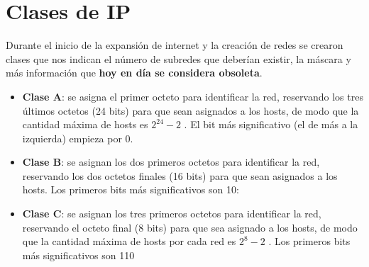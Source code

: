 \section{Clases de IP}
Durante el inicio de la expansión de internet y la creación de redes se crearon clases que nos indican el número de subredes que deberían existir, la máscara y más información que \textbf{hoy en día se considera obsoleta}.

\begin{itemize}
    \item \textbf{Clase A}: se asigna el primer octeto para identificar la red, reservando los tres últimos octetos (24 bits) para que sean asignados a los hosts, de modo que la cantidad máxima de hosts es $2^{24} - 2$ . El bit más significativo (el de más a la izquierda) empieza por 0.

    \item \textbf{Clase B}: se asignan los dos primeros octetos para identificar la red, reservando los dos octetos finales (16 bits) para que sean asignados a los hosts. Los primeros bits más significativos son 10:

    \item \textbf{Clase C}: se asignan los tres primeros octetos para identificar la red, reservando el octeto final (8 bits) para que sea asignado a los hosts, de modo que la cantidad máxima de hosts por cada red es $2^{8} - 2$ . Los primeros bits más significativos son 110
\end{itemize}